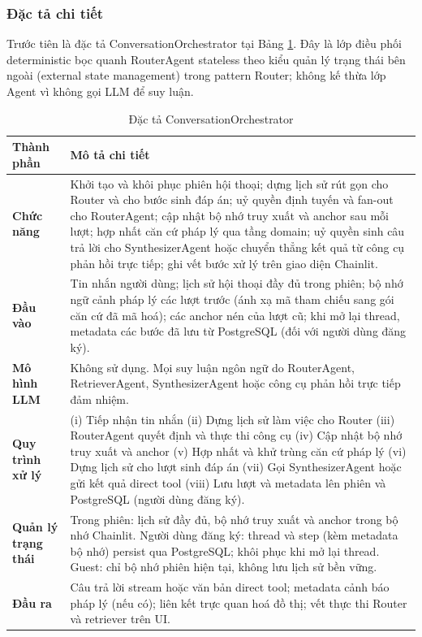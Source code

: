 \documentclass[../DoAn.tex]{subfiles}
\begin{document}
\subsubsection{Đặc tả chi tiết}

Trước tiên là đặc tả ConversationOrchestrator tại Bảng \ref{table: chat_orchestrator}. Đây là lớp điều phối deterministic bọc quanh RouterAgent stateless theo kiểu quản lý trạng thái bên ngoài (external state management) trong pattern Router; không kế thừa lớp Agent vì không gọi LLM để suy luận.

\begin{table}[H]
\centering
\begin{tabularx}{\textwidth}{|>{\raggedright\arraybackslash}p{3.8cm}|>{\raggedright\arraybackslash}X|}
\hline
\textbf{Thành phần} & \textbf{Mô tả chi tiết} \\ \hline
\textbf{Chức năng} & Khởi tạo và khôi phục phiên hội thoại; dựng lịch sử rút gọn cho Router và cho bước sinh đáp án; uỷ quyền định tuyến và fan-out cho RouterAgent; cập nhật bộ nhớ truy xuất và anchor sau mỗi lượt; hợp nhất căn cứ pháp lý qua tầng domain; uỷ quyền sinh câu trả lời cho SynthesizerAgent hoặc chuyển thẳng kết quả từ công cụ phản hồi trực tiếp; ghi vết bước xử lý trên giao diện Chainlit. \\ \hline
\textbf{Đầu vào} & Tin nhắn người dùng; lịch sử hội thoại đầy đủ trong phiên; bộ nhớ ngữ cảnh pháp lý các lượt trước (ánh xạ mã tham chiếu sang gói căn cứ đã mã hoá); các anchor nén của lượt cũ; khi mở lại thread, metadata các bước đã lưu từ PostgreSQL (đối với người dùng đăng ký). \\ \hline
\textbf{Mô hình LLM} & Không sử dụng. Mọi suy luận ngôn ngữ do RouterAgent, RetrieverAgent, SynthesizerAgent hoặc công cụ phản hồi trực tiếp đảm nhiệm. \\ \hline
\textbf{Quy trình xử lý} & (i) Tiếp nhận tin nhắn (ii) Dựng lịch sử làm việc cho Router (iii) RouterAgent quyết định và thực thi công cụ (iv) Cập nhật bộ nhớ truy xuất và anchor (v) Hợp nhất và khử trùng căn cứ pháp lý (vi) Dựng lịch sử cho lượt sinh đáp án (vii) Gọi SynthesizerAgent hoặc gửi kết quả direct tool (viii) Lưu lượt và metadata lên phiên và PostgreSQL (người dùng đăng ký). \\ \hline
\textbf{Quản lý trạng thái} & Trong phiên: lịch sử đầy đủ, bộ nhớ truy xuất và anchor trong bộ nhớ Chainlit. Người dùng đăng ký: thread và step (kèm metadata bộ nhớ) persist qua PostgreSQL; khôi phục khi mở lại thread. Guest: chỉ bộ nhớ phiên hiện tại, không lưu lịch sử bền vững. \\ \hline
\textbf{Đầu ra} & Câu trả lời stream hoặc văn bản direct tool; metadata cảnh báo pháp lý (nếu có); liên kết trực quan hoá đồ thị; vết thực thi Router và retriever trên UI. \\ \hline
\end{tabularx}
\caption{Đặc tả ConversationOrchestrator}
\label{table: chat_orchestrator}
\end{table}
\end{document}
